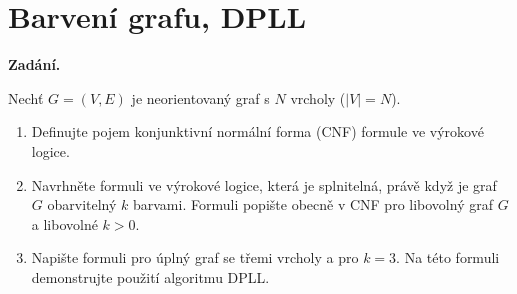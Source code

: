 \section{Barvení grafu, DPLL}

\noindent\textbf{Zadání.}\par
Nechť $G = (V, E)$ je neorientovaný graf s $N$ vrcholy ($|V| = N$).
\begin{enumerate}[nosep]
  \item Definujte pojem konjunktivní normální forma (CNF) formule ve výrokové logice.
  \item Navrhněte formuli ve výrokové logice, která je splnitelná, právě když je graf $G$ obarvitelný $k$ barvami. Formuli popište obecně v CNF pro libovolný graf $G$ a libovolné $k > 0$.
  \item Napište formuli pro úplný graf se třemi vrcholy a pro $k = 3$. Na této formuli demonstrujte použití algoritmu DPLL.
\end{enumerate}

